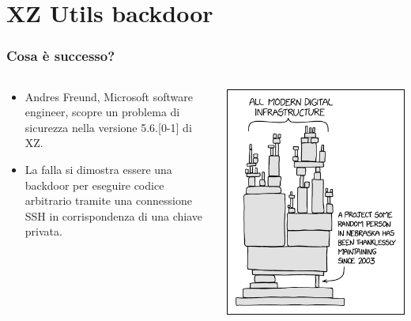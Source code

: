 \section{XZ Utils backdoor} %


\begin{frame}
\frametitle{Cosa è successo?}

\begin{columns}
        \begin{column}{0.5\textwidth}
            \begin{itemize}
                \item Andres Freund, Microsoft software engineer, scopre un problema di sicurezza nella versione 5.6.[0-1] di XZ.
                \item La falla si dimostra essere una backdoor per eseguire codice arbitrario tramite una connessione SSH in corrispondenza di una chiave privata.
            \end{itemize}
        \end{column}
        \begin{column}{0.5\textwidth}
            \centering
            \includegraphics[width=\textwidth]{img/2-Introduction/dependency_2x.png}
        \end{column}
\end{columns}

\end{frame}


